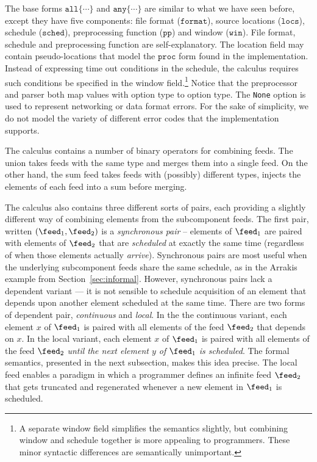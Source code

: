 The base forms $\mathtt{all \{ \cdots \}}$ and $\mathtt{any \{ \cdots \}}$
are similar to what we have seen before, except they have five components:
file format ($\mathtt{format}$), source locations ($\mathtt{locs}$), 
schedule ($\mathtt{sched}$), preprocessing function ($\mathtt{pp}$) 
and window ($\mathtt{win}$).
File format, schedule and preprocessing function are self-explanatory.
The location field may contain pseudo-locations that 
model the $\mathtt{proc}$ form found in the implementation.
Instead of expressing time out conditions in the schedule,
the calculus requires such conditions be specified in the window 
field.\footnote{A separate window field simplifies the semantics slightly,
but combining window and schedule together is more appealing to
programmers.  These minor syntactic differences are semantically unimportant.} 
Notice that the preprocessor
and parser both map values with option type to option type.
The {\tt None} option is used to represent networking or data format
errors.  For the sake of simplicity, 
we do not model the variety of different error codes that
the implementation supports. 

The calculus contains a number of binary operators for combining
feeds.  The union takes feeds with the same type and merges them
into a single feed.  On the other hand, the sum feed takes feeds
with (possibly) different types, injects the elements of each feed into
a sum before merging.  

The calculus also contains three different
sorts of pairs, each providing a slightly different way of
combining elements from the subcomponent feeds.  The first pair, 
written $(\feed_1, \feed_2)$ is a {\em synchronous pair} -- 
elements of $\feed_1$ are paired with elements of $\feed_2$
that are {\em scheduled} at exactly the same time (regardless of when those elements
actually {\em arrive}).  Synchronous pairs are most useful when the underlying
subcomponent feeds share the same schedule, as in the Arrakis example
from Section~\ref{sec:informal}.  However, synchronous pairs lack a
dependent variant --- it is not sensible to schedule acquisition of an element
that depends upon another element scheduled at the same time.
There are two forms of dependent pair, {\em continuous} and {\em local}.
In the the continuous variant, each element $x$ of $\feed_1$ is paired 
with all elements of the feed $\feed_2$ that depends on $x$.  In the
local variant, each element $x$ of $\feed_1$
is paired with all elements of the feed $\feed_2$ {\em until the next
element $y$ of $\feed_1$ is scheduled}.  The formal semantics, presented
in the next subsection, makes this idea precise.  The local feed
enables a paradigm in which a programmer defines an infinite feed $\feed_2$
that gets truncated and regenerated whenever a new element in $\feed_1$
is scheduled.


